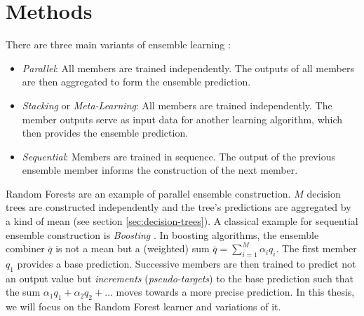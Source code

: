 \documentclass[
	twoside=false, %
]{kaobook}
\begin{document}
\section{Methods}
\label{sec:ensemble-learning-methods}
There are three main variants of ensemble learning \cite{mienye_SurveyEnsembleLearning_2022}:
\begin{itemize}
\item \textit{Parallel}: All members are trained independently. The outputs of all members are then aggregated to form the ensemble prediction.
\item \textit{Stacking} or \textit{Meta-Learning}: All members are trained independently. The member outputs serve as input data for another learning algorithm, which then provides the ensemble prediction.
\item \textit{Sequential}: Members are trained in sequence. The output of the previous ensemble member informs the construction of the next member.
\end{itemize}
Random Forests \cite{breiman_RandomForests_2001} are an example of parallel ensemble construction. $M$ decision trees are constructed independently and the tree's predictions are aggregated by a kind of mean (see section \ref{sec:decision-trees}). A classical example for sequential ensemble construction is \textit{Boosting} \cite{schapire_BoostingFoundationsAlgorithms_2012}. In boosting algorithms, the ensemble combiner $\bar{q}$ is not a mean but a (weighted) sum $\bar{q} = \sum_{i=1}^M \alpha_{i}q_{i}$. The first member $q_{1}$ provides a base prediction. Successive members are then trained to predict not an output value but \textit{increments} (\textit{pseudo-targets}) to the base prediction such that the sum $\alpha_{1}q_{1} + \alpha_{2}q_{2} + \dots$ moves towards a more precise prediction. 
In this thesis, we will focus on the Random Forest learner and variations of it. 



\end{document}
